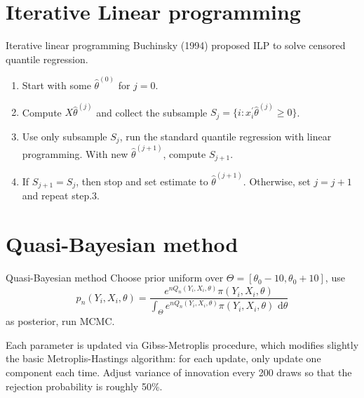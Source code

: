 \documentclass{beamer}
\begin{document}
\section{Iterative Linear programming}
\begin{frame}{Iterative linear programming}
   Buchinsky (1994) proposed ILP to solve censored quantile regression.
    \begin{enumerate}
    \item Start with some $\hat{\theta}^{(0)}$ for $j=0$.
    \item Compute $X\hat{\theta}^{(j)}$ and collect the subsample $S_j = \{ i: x_i^{'}\hat{\theta}^{(j)}\geq 0 \}$.
    \item Use only subsample $S_j$, run the standard quantile regression with linear programming. With new $\hat{\theta}^{(j+1)}$, compute $S_{j+1}$.
    \item If $S_{j+1} = S_j$, then stop and set estimate to $\hat{\theta}^{(j+1)}$. Otherwise, set $j=j+1$ and repeat step.3.
\end{enumerate}
\end{frame}

\section{Quasi-Bayesian method}
\begin{frame}{Quasi-Bayesian method}
    Choose prior uniform over $\Theta = [\theta_0-10,\theta_0+10]$, use
    \begin{equation*}
        p_n(Y_i,X_i,\theta)=\frac{e^{nQ_n(Y_i,X_i,\theta)}\pi(Y_i,X_i,\theta)}{\int_{\Theta}e^{nQ_n(Y_i,X_i,\theta)}\pi(Y_i,X_i,\theta)\mbox{ d}\theta }
    \end{equation*}
    as posterior, run MCMC.

    Each parameter is updated via Gibss-Metroplis procedure, which modifies slightly the basic Metroplis-Hastings algorithm: for each update, only update one component each time. Adjust variance of innovation every 200 draws so that the rejection probability is roughly 50\%.
    
\end{frame}
\end{document}
